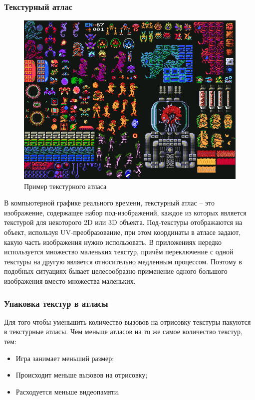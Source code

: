 \documentclass{fefu}
\begin{document}
\subsubsection{Текстурный атлас}
\begin{figure}[H]
    \centering
    \includegraphics[scale=0.6]{images/TextureAtlas.png}
    \caption{Пример текстурного атласа}
\end{figure}
В компьютерной графике реального времени, текстурный атлас -- это изображение, содержащее набор
под-изображений, каждое из которых является текстурой для некоторого 2D или 3D объекта. Под-текстуры
отображаются на объект, используя UV-преобразование, при этом координаты в атласе задают, какую часть изображения
нужно использовать. В приложениях нередко используется множество маленьких текстур, причём переключение с одной
текстуры на другую является относительно медленным процессом. Поэтому в подобных ситуациях бывает целесообразно
применение одного большого изображения вместо множества маленьких.
\subsubsection{Упаковка текстур в атласы}
Для того чтобы уменьшить количество вызовов на отрисовку текстуры пакуются в текстурные атласы. Чем меньше атласов на
то же самое количество текстур, тем:
\begin{itemize}
    \item Игра занимает меньший размер;
    \item Происходит меньше вызовов на отрисовку;
    \item Расходуется меньше видеопамяти.
\end{itemize}
\end{document}
